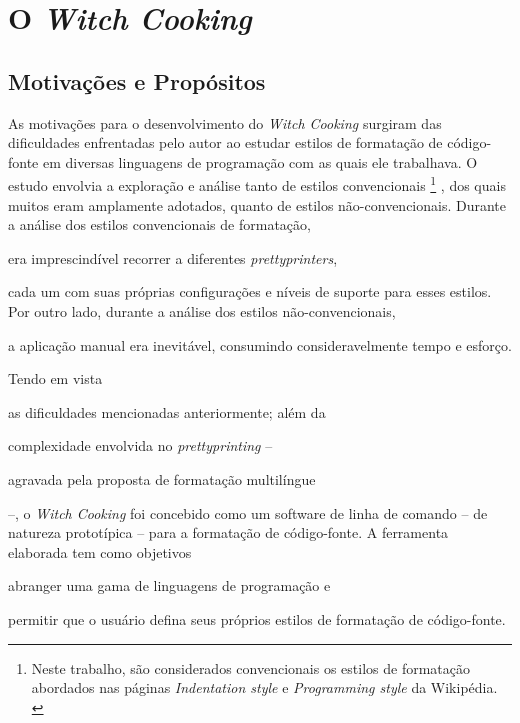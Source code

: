 \documentclass
  [11pt,a4paper,english,brazil,openright,sumario=tradicional,twoside]
  {abntex2}
\newcommand{\witchcooking}{\textit{Witch Cooking}\xspace}
\begin{document}

  \chapter{O \witchcooking}


  \section{Motivações e Propósitos}

  As motivações para o desenvolvimento do \witchcooking surgiram das
  dificuldades enfrentadas pelo autor ao estudar estilos de formatação de
  código-fonte em diversas linguagens de programação com as quais ele
  trabalhava. O estudo envolvia a exploração e análise tanto de estilos
  convencionais%
  \footnote
    { Neste trabalho, são considerados convencionais os estilos de formatação
      abordados nas páginas \textit{Indentation style} e
      \textit{Programming style} da Wikipédia.
      \cites{wiki-2023-indentation}{wiki-2023-programming}}%
  , dos quais muitos eram amplamente adotados, quanto de estilos
  não-convencionais. Durante a análise dos estilos convencionais de formatação,
  \begin{inparaenum}
    \item era imprescindível recorrer a diferentes \textit{prettyprinters},
    \item cada um com suas próprias configurações e níveis de suporte para
          esses estilos. Por outro lado, durante a análise dos estilos
          não-convencionais,
    \item a aplicação manual era inevitável, consumindo consideravelmente tempo
          e esforço.
  \end{inparaenum}

  Tendo em vista
  \begin{inparaenum}
    \item as dificuldades mencionadas anteriormente; além da
    \item complexidade envolvida no \textit{prettyprinting} --
    \item agravada pela proposta de formatação multilíngue
  \end{inparaenum}
  --, o \witchcooking foi concebido como um software de linha de comando --
  de natureza prototípica -- para a formatação de código-fonte. A ferramenta
  elaborada tem como objetivos
  \begin{inparaenum}
    \item abranger uma gama de linguagens de programação e
    \item permitir que o usuário defina seus próprios estilos de formatação
          de código-fonte.
  \end{inparaenum}
\end{document}
